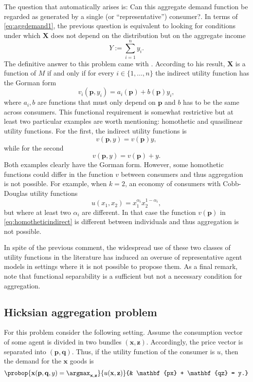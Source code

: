 \documentclass[english, a4paper,12pt]{article}
\begin{document}
The question that automatically arises is: Can this aggregate demand function be regarded as generated by a single (or ``representative'') consumer?. In terms of \cref{eq:aggdemand1}, the previous question is equivalent to looking for conditions under which $\mathbf{X}$ does not depend on the distribution but on the aggregate income
	$$Y := \sum_{i=1}^{n} y_{i}.$$
The definitive answer to this problem came with \cite{Gorman53}. According to his result, $\mathbf{X}$ is a function of $M$ if and only if for every $i \in \{1,\ldots,n\}$ the indirect utility function has the Gorman form
	$$v_{i}(\mathbf{p}, y_{i}) = a_{i}(\mathbf{p}) + b(\mathbf{p})y_{i},$$ 
where $a_{i}, b$ are functions that must only depend on $\mathbf{p}$ and $b$ has to be the same across consumers. This functional requirement is somewhat restrictive but at least two particular examples are worth mentioning: homothetic and quasilinear utility functions. For the first, the indirect utility functions is
	\begin{equation} \label{eq:homotheticindirect}
		v(\mathbf{p}, y) = v(\mathbf{p})y,
	\end{equation}
while for the second
	$$v(\mathbf{p}, y) = v(\mathbf{p}) + y.$$
Both examples clearly have the Gorman form. However, some homothetic functions could differ in the function $v$ between consumers and thus aggregation is not possible. For example, when $k = 2$, an economy of consumers with Cobb-Douglas utility functions
	$$u(x_{1}, x_{2}) = x_{1}^{\alpha_{i}}x_{2}^{1-\alpha_{i}},$$
but where at least two $\alpha_{i}$ are different. In that case the function $v(\mathbf{p})$ in \eqref{eq:homotheticindirect} is different between individuals and thus aggregation is not possible.

In spite of the previous comment, the widespread use of these two classes of utility functions in the literature has induced an overuse of representative agent models in settings where it is not possible to propose them.  As a final remark, note that functional separability is a sufficient but not a necessary condition for aggregation. 

\subsection{Hicksian aggregation problem} \label{ssec:repagent}
For this problem consider the following setting. Assume the consumption vector of some agent is divided in two bundles $(\mathbf{x}, \mathbf{z})$. Accordingly, the price vector is separated into $(\mathbf{p}, \mathbf{q})$. Thus, if the utility function of the consumer is $u$, then the demand for the $\mathbf{x}$ goods is
	\begin{equation} \label{eq:hickdisprob}
		\probop{\mathbf{x}(\mathbf{p}, \mathbf{q}, y) = \argmax_{\mathbf{x}, \mathbf{z}}}{u(\mathbf{x}, \mathbf{z})}
					{&	\mathbf{px} + \mathbf{qz} = y.}
	\end{equation}
\end{document}
